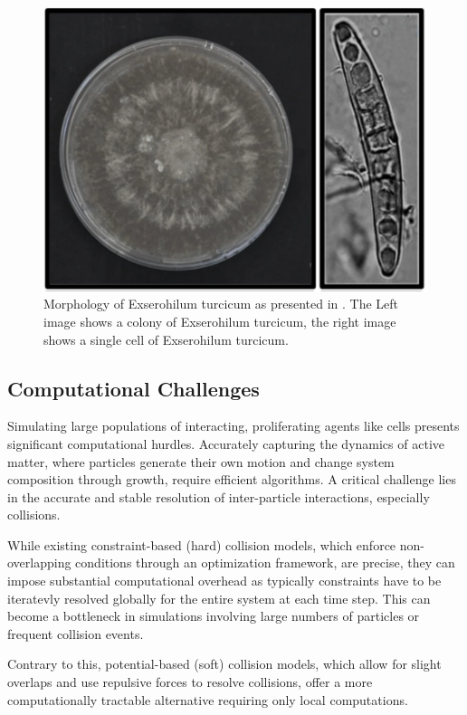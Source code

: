 \documentclass[conference]{IEEEtran}
\begin{document}
\begin{figure}
    \centering
    \includegraphics[width=\linewidth]{figures/real-bacteria/Exserohilum turcicum.png}
    \caption{Morphology of Exserohilum turcicum as presented in \cite{Bankole2023}. The Left image shows a colony of Exserohilum turcicum, the right image shows a single cell of Exserohilum turcicum.}
    \label{fig:exserohilum_turcicum}
\end{figure}

\subsection{Computational Challenges}

Simulating large populations of interacting, proliferating agents like cells presents significant computational hurdles. Accurately capturing the dynamics of active matter, where particles generate their own motion and change system composition through growth, require efficient algorithms. A critical challenge lies in the accurate and stable resolution of inter-particle interactions, especially collisions.

While existing constraint-based (hard) collision models, which enforce non-overlapping conditions through an optimization framework, are precise, they can impose substantial computational overhead as typically constraints have to be iteratevly resolved globally for the entire system at each time step. This can become a bottleneck in simulations involving large numbers of particles or frequent collision events.

Contrary to this, potential-based (soft) collision models, which allow for slight overlaps and use repulsive forces to resolve collisions, offer a more computationally tractable alternative requiring only local computations.
\end{document}

